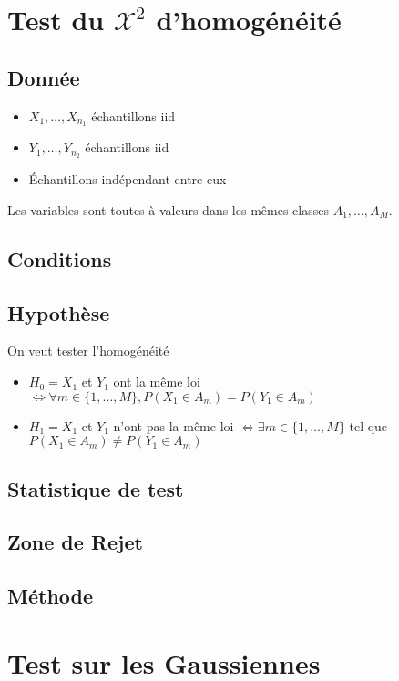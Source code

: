 \documentclass{article}
\theoremstyle{plain}%
\theoremstyle{definition}
\theoremstyle{remark}
\begin{document}
\section{Test du $ \mathcal{X}^2 $ d'homogénéité}
\subsection*{Donnée}
\begin{itemize}
    \item $ X_1, \dots, X_{n_1} $ échantillons iid
    \item $ Y_1, \dots, Y_{n_2} $ échantillons iid
    \item Échantillons indépendant entre eux
\end{itemize}
Les variables sont toutes à valeurs dans les mêmes classes $ A_1, \dots, A_M $.

\subsection*{Conditions}
\subsection*{Hypothèse}
On veut tester l'homogénéité \begin{itemize}
    \item $ H_0 = X_1$ et $ Y_1 $  ont la même loi $ \Leftrightarrow \forall m \in \{1,\dots,M \}, P(X_1 \in A_m) = P(Y_1 \in A_m) $ 
    \item $ H_1 = X_1$ et $ Y_1 $  n'ont pas la même loi $ \Leftrightarrow \exists m \in \{1, \dots, M\} $ tel que $ P(X_1 \in A_m) \neq P(Y_1 \in A_m) $ 
\end{itemize}
\subsection*{Statistique de test}
\subsection*{Zone de Rejet}
\subsection*{Méthode}

\section{Test sur les Gaussiennes}
\end{document}
